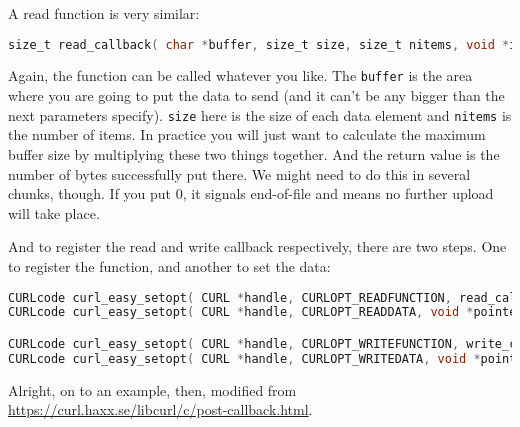 A read function is very similar:
\begin{lstlisting}[language=C]
size_t read_callback( char *buffer, size_t size, size_t nitems, void *inputdata );
\end{lstlisting}
Again, the function can be called whatever you like. The \texttt{buffer} is the area where you are going to put the data to send (and it can't be any bigger than the next parameters specify). \texttt{size} here is the size of each data element and \texttt{nitems} is the number of items. In practice you will just want to calculate the maximum buffer size by multiplying these two things together. And the return value is the number of bytes successfully put there. We might need to do this in several chunks, though. If you put 0, it signals end-of-file and means no further upload will take place.

And to register the read and write callback respectively, there are two steps. One to register the function, and another to set the data:
\begin{lstlisting}[language=C]
CURLcode curl_easy_setopt( CURL *handle, CURLOPT_READFUNCTION, read_callback );
CURLcode curl_easy_setopt( CURL *handle, CURLOPT_READDATA, void *pointer );

CURLcode curl_easy_setopt( CURL *handle, CURLOPT_WRITEFUNCTION, write_callback );
CURLcode curl_easy_setopt( CURL *handle, CURLOPT_WRITEDATA, void *pointer );
\end{lstlisting}

Alright, on to an example, then, modified from \url{https://curl.haxx.se/libcurl/c/post-callback.html}.

